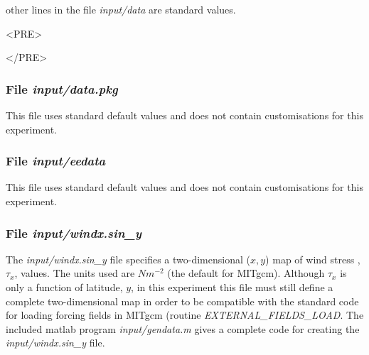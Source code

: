 \begin{itemize}

\end{itemize}

\noindent other lines in the file {\it input/data} are standard values.

\begin{rawhtml}<PRE>\end{rawhtml}
\begin{small}

\end{small}
\begin{rawhtml}</PRE>\end{rawhtml}

\subsubsection{File {\it input/data.pkg}}

This file uses standard default values and does not contain
customisations for this experiment.

\subsubsection{File {\it input/eedata}}

This file uses standard default values and does not contain
customisations for this experiment.

\subsubsection{File {\it input/windx.sin\_y}}

The {\it input/windx.sin\_y} file specifies a two-dimensional ($x,y$)
map of wind stress ,$\tau_{x}$, values. The units used are $Nm^{-2}$
(the default for MITgcm).  Although $\tau_{x}$ is only a function of
latitude, $y$, in this experiment this file must still define a
complete two-dimensional map in order to be compatible with the
standard code for loading forcing fields in MITgcm (routine {\it
  EXTERNAL\_FIELDS\_LOAD}.  The included matlab program {\it
  input/gendata.m} gives a complete code for creating the {\it
  input/windx.sin\_y} file.

